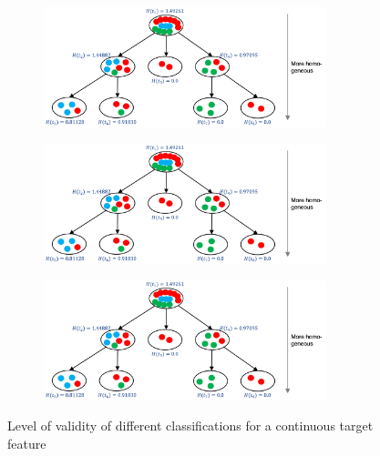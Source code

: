 \begin{figure}[h]
  \centering
  \begin{subfigure}{0.3\textwidth}
    \centering
    \includegraphics[width=0.9\textwidth]{assets/trees/cont/target_good.png}
  \end{subfigure}
  \begin{subfigure}{0.3\textwidth}
    \centering
    \includegraphics[width=0.9\textwidth]{assets/trees/cont/target_ok.png}
  \end{subfigure}
  \begin{subfigure}{0.3\textwidth}
    \centering
    \includegraphics[width=0.9\textwidth]{assets/trees/cont/target_bad.png}
  \end{subfigure}
  \caption{Level of validity of different classifications for a continuous target feature}
  \label{fig:3_classifications_target}
\end{figure}

